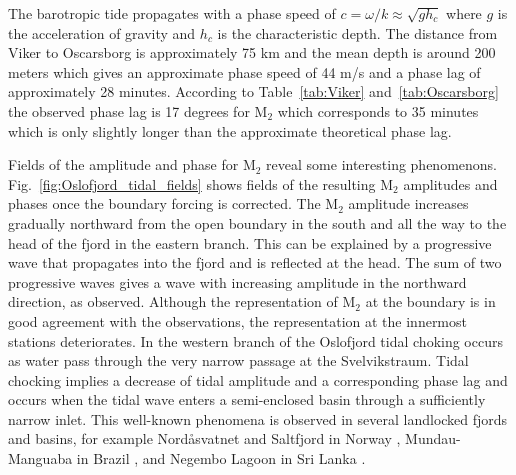 
The barotropic tide propagates with a phase speed of $c = \omega/k \approx \sqrt{g h_c}$ where $g$ is the acceleration of gravity and $h_c$ is the characteristic depth. The distance from Viker to Oscarsborg is approximately 75 km and the mean depth is around 200 meters which gives an approximate phase speed of 44 m/s and a phase lag of approximately 28 minutes. According to Table~\ref{tab:Viker} and~\ref{tab:Oscarsborg} the observed phase lag is 17 degrees for M$_2$ which corresponds to 35 minutes which is only slightly longer than the approximate theoretical phase lag. 

Fields of the amplitude and phase for M$_2$ reveal some interesting phenomenons. Fig.~\ref{fig:Oslofjord_tidal_fields} shows fields of the resulting M$_2$ amplitudes and phases once the boundary forcing is corrected. 
The M$_2$ amplitude increases gradually northward from the open boundary in the south and all the way to the head of the fjord in the eastern branch. 
This can be explained by a progressive wave that propagates into the fjord and is reflected at the head.
The sum of two progressive waves gives a wave with increasing amplitude in the northward direction, as observed. 
Although the representation of M$_2$ at the boundary is in good agreement with the observations, the representation at the innermost stations deteriorates.
In the western branch of the Oslofjord tidal choking occurs as water pass through the very narrow passage at the Svelvikstraum. Tidal chocking implies a decrease of tidal amplitude and a corresponding phase lag \cite[]{stigebrandt80} and occurs when the tidal wave enters a semi-enclosed basin through a sufficiently narrow inlet. This well-known phenomena is observed in several landlocked fjords and basins, for example Nord{\aa}svatnet and Saltfjord in Norway \cite[]{glenne63,eliassen01}, Mundau-Manguaba in Brazil \cite[]{oliveira93}, and Negembo Lagoon in Sri Lanka \cite[]{rydberg96}. 

